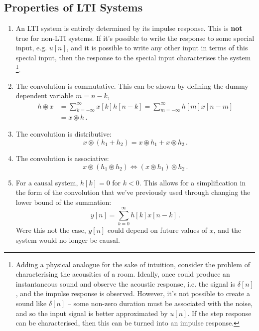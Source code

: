 \subsection{Properties of LTI Systems}
%
\begin{enumerate}
\item An LTI system is entirely determined by its impulse response. This is \textbf{not} true
  for non-LTI systems. If it's possible to write the response to some special input, e.g. $u[n]$,
  and it is possible to write any other input in terms of this special input, then the response
  to the special input characterises the system
  \footnote{
    Adding a physical analogue for the sake of intuition, consider the problem of characterising
    the acousitics of a room. Ideally, once could produce an instantaneous sound and observe
    the acoustic response, i.e. the signal is $\delta[n]$, and the impulse response is observed.
    However, it's not possible to create a sound like $\delta[n]$ -- some non-zero duration must
    be associated with the noise, and so the input signal is better approximated by $u[n]$. If the
    step response can be characterised, then this can be turned into an impulse response.
  }.\\
\item The convolution is commutative. This can be shown by defining the dummy dependent variable
  $m = n - k$,
  \begin{align*}
    h \circledast x &= \sum_{k=-\infty}^\infty x[k] h[n-k] = \sum_{m=-\infty}^\infty h[m] x[n-m] \\
    &= x \circledast h \,.
  \end{align*}
\item The convolution is distributive:
  \begin{displaymath}
    x \circledast (h_1 + h_2) = x \circledast h_1 + x \circledast h_2 \,.
  \end{displaymath}
\item The convolution is associative:
  \begin{displaymath}
    x \circledast (h_1 \circledast h_2) \Longleftrightarrow (x \circledast h_1) \circledast h_2 \,.
  \end{displaymath}
\item For a causal system, $h[k] = 0$ for $k < 0$. This allows for a simplification in the
  form of the convolution that we've previously used through changing the lower bound of
  the summation:
  \begin{equation}
    y[n] = \sum_{k=0}^\infty h[k]x[n-k] \,.
  \end{equation}
  Were this not the case, $y[n]$ could depend on future values of $x$, and the system would no
  longer be causal.
\end{enumerate}
